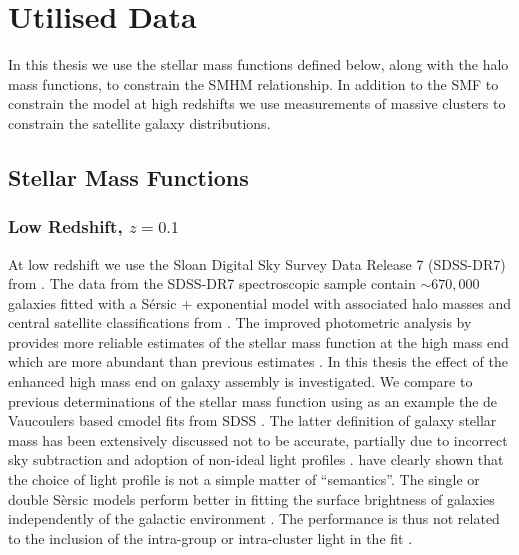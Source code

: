 \section{Utilised Data}

In this thesis we use the stellar mass functions defined below, along with the halo mass functions, to constrain the SMHM relationship. In addition to the SMF to constrain the model at high redshifts we use measurements of massive clusters to constrain the satellite galaxy distributions.

\subsection{Stellar Mass Functions}
\label{subsec:SMF}

\subsubsection{Low Redshift, $z = 0.1$}
\label{subsub:SDSS}
At low redshift we use the Sloan Digital Sky Survey Data Release 7 (SDSS-DR7) from \citet{Meert2015ASystematics}.
The data from the SDSS-DR7 spectroscopic sample \citep{Abazajian2009THESURVEY} contain $\sim 670,000$ galaxies fitted with a S\'ersic + exponential model \citep[PyMorph;][]{Meert2015ASystematics} with associated halo masses and central satellite classifications from \citep{Yang2012EvolutionHalos}. The improved photometric analysis by \citet{Meert2015ASystematics} provides more reliable estimates of the stellar mass function at the high mass end which are more abundant than previous estimates \citep{Bernardi2016TheEvolution, Bernardi2017ComparingLight}.
In this thesis the effect of the enhanced high mass end on galaxy assembly is investigated. We compare to previous determinations of the stellar mass function using as an example the de Vaucoulers \citep{deVaucouleurs1948RecherchesExtragalactiques} based cmodel fits from SDSS \citep{Abazajian2009THESURVEY}. The latter definition of galaxy stellar mass has been extensively discussed not to be accurate, partially due to incorrect sky subtraction and adoption of non-ideal light profiles \citep{Bernardi2013TheProfile}. \citet{Bernardi2017ComparingLight} have clearly shown that the choice of light profile is not a simple matter of ``semantics''. The single or double S\`ersic models perform better in fitting the surface brightness of galaxies independently of the galactic environment \citep{Meert2015ASystematics}. The performance is thus not related to the inclusion of the intra-group or intra-cluster light in the fit \citep{Bernardi2017ComparingLight}.

